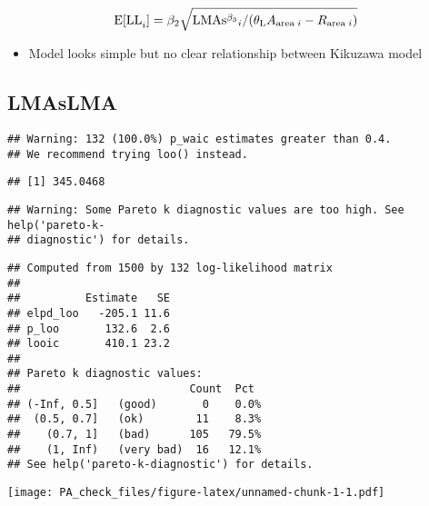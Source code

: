 \documentclass[12pt,]{article}
\providecommand{\tightlist}{%
  \setlength{\itemsep}{0pt}\setlength{\parskip}{0pt}}
\begin{document}
\begin{align}
  {\rm E[LL}_{i}] &=\beta_{2} \sqrt{{\rm LMAs^{\beta_3}}_{i}
  / (\theta_{\rm L} A_{{\rm area} \; i} - R_{{\rm area} \; i})} \notag \\
  \label{eq:power-simple}
\end{align}

\begin{itemize}
\tightlist
\item
  Model looks simple but no clear relationship between Kikuzawa model
\end{itemize}

\newpage

\subsection{LMAsLMA}\label{lmaslma}

\begin{verbatim}
## Warning: 132 (100.0%) p_waic estimates greater than 0.4.
## We recommend trying loo() instead.
\end{verbatim}

\begin{verbatim}
## [1] 345.0468
\end{verbatim}

\begin{verbatim}
## Warning: Some Pareto k diagnostic values are too high. See help('pareto-k-
## diagnostic') for details.
\end{verbatim}

\begin{verbatim}
## Computed from 1500 by 132 log-likelihood matrix
## 
##          Estimate   SE
## elpd_loo   -205.1 11.6
## p_loo       132.6  2.6
## looic       410.1 23.2
## 
## Pareto k diagnostic values:
##                          Count  Pct 
## (-Inf, 0.5]   (good)       0    0.0%
##  (0.5, 0.7]   (ok)        11    8.3%
##    (0.7, 1]   (bad)      105   79.5%
##    (1, Inf)   (very bad)  16   12.1%
## See help('pareto-k-diagnostic') for details.
\end{verbatim}

\texttt{[image: PA\_check\_files/figure-latex/unnamed-chunk-1-1.pdf]}
\end{document}
